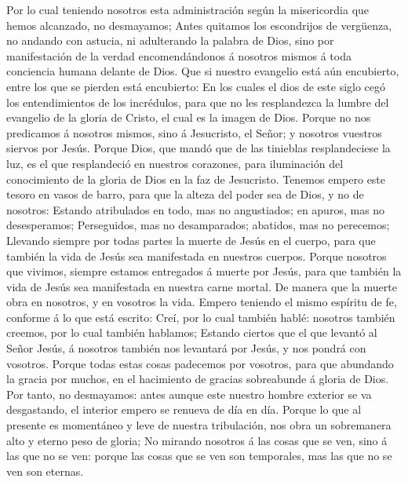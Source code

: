  Por lo cual teniendo nosotros esta administración según
la misericordia que hemos alcanzado, no desmayamos;  Antes
quitamos los escondrijos de vergüenza, no andando con astucia, ni
adulterando la palabra de Dios, sino por manifestación de la verdad
encomendándonos á nosotros mismos á toda conciencia humana delante de
Dios.  Que si nuestro evangelio está aún encubierto, entre
los que se pierden está encubierto:  En los cuales el dios
de este siglo cegó los entendimientos de los incrédulos, para que no les
resplandezca la lumbre del evangelio de la gloria de Cristo, el cual es
la imagen de Dios.  Porque no nos predicamos á nosotros
mismos, sino á Jesucristo, el Señor; y nosotros vuestros siervos por
Jesús.  Porque Dios, que mandó que de las tinieblas
resplandeciese la luz, es el que resplandeció en nuestros corazones,
para iluminación del conocimiento de la gloria de Dios en la faz de
Jesucristo.  Tenemos empero este tesoro en vasos de barro,
para que la alteza del poder sea de Dios, y no de nosotros:
 Estando atribulados en todo, mas no angustiados; en
apuros, mas no desesperamos;  Perseguidos, mas no
desamparados; abatidos, mas no perecemos;  Llevando
siempre por todas partes la muerte de Jesús en el cuerpo, para que
también la vida de Jesús sea manifestada en nuestros cuerpos.
 Porque nosotros que vivimos, siempre estamos entregados
á muerte por Jesús, para que también la vida de Jesús sea manifestada en
nuestra carne mortal.  De manera que la muerte obra en
nosotros, y en vosotros la vida.  Empero teniendo el
mismo espíritu de fe, conforme á lo que está escrito: Creí, por lo cual
también hablé: nosotros también creemos, por lo cual también hablamos;
 Estando ciertos que el que levantó al Señor Jesús, á
nosotros también nos levantará por Jesús, y nos pondrá con vosotros.
 Porque todas estas cosas padecemos por vosotros, para
que abundando la gracia por muchos, en el hacimiento de gracias
sobreabunde á gloria de Dios.  Por tanto, no desmayamos:
antes aunque este nuestro hombre exterior se va desgastando, el interior
empero se renueva de día en día.  Porque lo que al
presente es momentáneo y leve de nuestra tribulación, nos obra un
sobremanera alto y eterno peso de gloria;  No mirando
nosotros á las cosas que se ven, sino á las que no se ven: porque las
cosas que se ven son temporales, mas las que no se ven son eternas.

